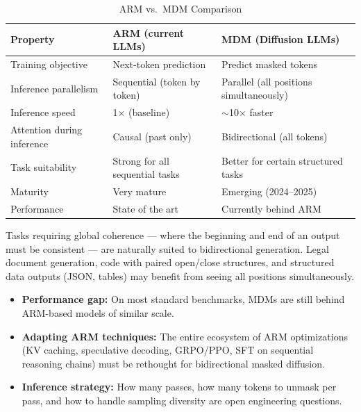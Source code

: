 \documentclass[11pt, a4paper]{article}
\begin{document}
\begin{table}[h]
\centering
\caption{ARM vs.\ MDM Comparison}
\begin{tabular}{@{}p{4cm}p{4.5cm}p{4.5cm}@{}}
\toprule
\textbf{Property} & \textbf{ARM (current LLMs)} & \textbf{MDM (Diffusion LLMs)} \\
\midrule
Training objective & Next-token prediction & Predict masked tokens \\
Inference parallelism & Sequential (token by token) & Parallel (all positions simultaneously) \\
Inference speed & 1$\times$ (baseline) & $\sim$10$\times$ faster \\
Attention during inference & Causal (past only) & Bidirectional (all tokens) \\
Task suitability & Strong for all sequential tasks & Better for certain structured tasks \\
Maturity & Very mature & Emerging (2024--2025) \\
Performance & State of the art & Currently behind ARM \\
\bottomrule
\end{tabular}
\end{table}

\begin{notebox}
Tasks requiring global coherence --- where the beginning and end of an output must be consistent --- are naturally suited to bidirectional generation. Legal document generation, code with paired open/close structures, and structured data outputs (JSON, tables) may benefit from seeing all positions simultaneously.
\end{notebox}

\begin{warnbox}
\begin{itemize}[leftmargin=1.5em]
  \item \textbf{Performance gap:} On most standard benchmarks, MDMs are still behind ARM-based models of similar scale.
  \item \textbf{Adapting ARM techniques:} The entire ecosystem of ARM optimizations (KV caching, speculative decoding, GRPO/PPO, SFT on sequential reasoning chains) must be rethought for bidirectional masked diffusion.
  \item \textbf{Inference strategy:} How many passes, how many tokens to unmask per pass, and how to handle sampling diversity are open engineering questions.
\end{itemize}
\end{warnbox}
\end{document}
